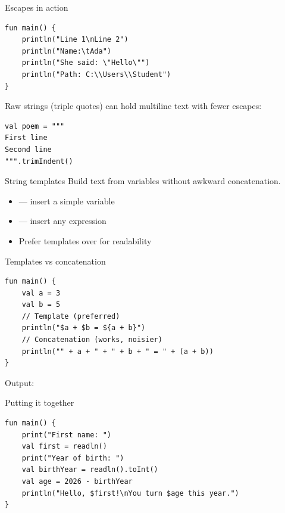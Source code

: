 \documentclass[aspectratio=169,11pt]{beamer}
\begin{document}
    \begin{frame}[fragile]{Escapes in action}
        \begin{lstlisting}
fun main() {
    println("Line 1\nLine 2")
    println("Name:\tAda")
    println("She said: \"Hello\"")
    println("Path: C:\\Users\\Student")
}
        \end{lstlisting}
        \vspace{0.3em}
        Raw strings (triple quotes) can hold multiline text with fewer escapes:
        \begin{lstlisting}
val poem = """
First line
Second line
""".trimIndent()
        \end{lstlisting}
    \end{frame}

    \begin{frame}{String templates}
        Build text from variables without awkward concatenation.
        \vspace{0.5em}
        \begin{itemize}
            \item {} --- insert a simple variable
            \item {} --- insert any expression
            \item Prefer templates over \kotlincode{+} for readability
        \end{itemize}
    \end{frame}

    \begin{frame}[fragile]{Templates vs concatenation}
        \begin{lstlisting}
fun main() {
    val a = 3
    val b = 5
    // Template (preferred)
    println("$a + $b = ${a + b}")
    // Concatenation (works, noisier)
    println("" + a + " + " + b + " = " + (a + b))
}
        \end{lstlisting}
        \vspace{0.3em}
        Output: 
        \vspace{0.4em}
    \end{frame}

    \begin{frame}[fragile]{Putting it together}
        \begin{lstlisting}
fun main() {
    print("First name: ")
    val first = readln()
    print("Year of birth: ")
    val birthYear = readln().toInt()
    val age = 2026 - birthYear
    println("Hello, $first!\nYou turn $age this year.")
}
        \end{lstlisting}
    \end{frame}
\end{document}
